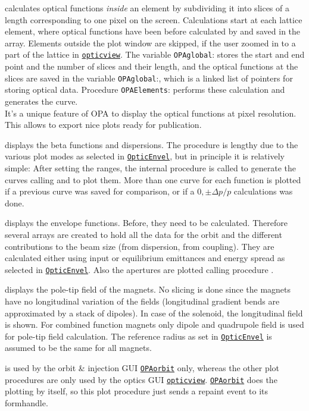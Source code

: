 \documentclass[12pt]{article}
\newcommand\code[1]{{\tt #1}}
\newcommand{\unico}[1]{{\color{burntorange}\code{#1}}}
\newcommand{\vrcod}[2]{\opauni{#1}:\unico{#2}}
\newcommand{\opagui}[1]{\colorbox{blue!20}{\code{#1}}}
\newcommand{\ogui}[1]{\hyperref[#1]{\opagui{#1}}}
\newcommand{\opauni}[1]{\colorbox{orange!30}{\code{#1}}}
\newcommand{\feature}[1]{{\color{cadmiumgreen} #1}}
\begin{document}
{\unico{SliceCalcN} calculates optical functions {\em inside} an element by subdividing it into slices of a length corresponding to one pixel on the screen. Calculations start at each lattice element, where optical functions have been before calculated by \unico{Linop} and saved in the \unico{Opval} array. Elements outside the plot window are skipped, if the user zoomed in to a part of the lattice in \ogui{opticview}. The variable \vrcod{OPAglobal}{CurvePlot} stores the start and end point and the number of slices and their length, and the optical functions at the slices are saved in the variable \vrcod{OPAglobal}{Curve}, which is a linked list of pointers for storing optical data. Procedure \vrcod{OPAElements}{SlicingN} performs these calculation and generates the curve.\\
\feature{It's a unique feature of OPA to display the optical functions at pixel resolution. This allows to export nice plots ready for publication.}

\unico{PlotBeta} displays the beta functions and dispersions. The procedure is lengthy due to the various plot modes as selected in \ogui{OpticEnvel}, but in principle it is relatively simple: After setting the ranges, the internal procedure \unico{BetaCurveN} is called to generate the curves calling \unico{SliceCalcN} and to plot them. More than one curve for each function is plotted if a previous curve was saved for comparison, or if a $0,\pm\Delta p/p$ calculations was done.

\unico{PlotEnv} displays the envelope functions. Before, they need to be calculated. Therefore several arrays are created to hold all the data for the orbit and the different contributions to the beam size (from dispersion, from coupling). They are calculated either using input or equilibrium emittances and energy spread as selected in \ogui{OpticEnvel}. Also the apertures are plotted calling procedure \unico{PlotApertures}.

\unico{PlotMag} displays the pole-tip field of the magnets. No slicing is done since the magnets have no longitudinal variation of the fields (longitudinal gradient bends are approximated by a stack of dipoles). In case of the solenoid, the longitudinal field is shown. For combined function magnets only dipole and quadrupole field is used for pole-tip field calculation. The reference radius as set in \ogui{OpticEnvel} is assumed to be the same for all magnets.

\unico{PlotOrbit} is used by the orbit \& injection GUI \ogui{OPAorbit} only, whereas the other plot procedures are only used by the optics GUI \ogui{opticview}. \ogui{OPAorbit} does the plotting by itself, so this plot procedure just sends a repaint event to its formhandle.\\

}
\end{document}
